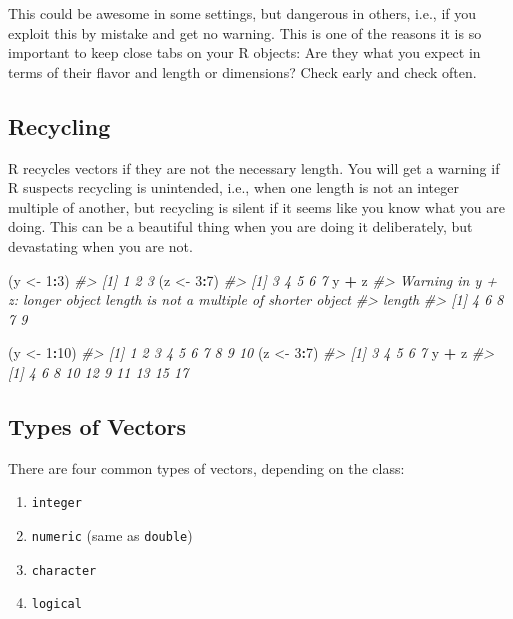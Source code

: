 \documentclass[
]{book}
\newenvironment{Shaded}{\begin{snugshade}}{\end{snugshade}}
\newcommand{\CommentTok}[1]{\textcolor[rgb]{0.56,0.35,0.01}{\textit{#1}}}
\newcommand{\DecValTok}[1]{\textcolor[rgb]{0.00,0.00,0.81}{#1}}
\newcommand{\NormalTok}[1]{#1}
\newcommand{\OperatorTok}[1]{\textcolor[rgb]{0.81,0.36,0.00}{\textbf{#1}}}
\newcommand{\StringTok}[1]{\textcolor[rgb]{0.31,0.60,0.02}{#1}}
\providecommand{\tightlist}{%
  \setlength{\itemsep}{0pt}\setlength{\parskip}{0pt}}
\begin{document}
This could be awesome in some settings, but dangerous in others, i.e., if you exploit this by mistake and get no warning. This is one of the reasons it is so important to keep close tabs on your R objects: Are they what you expect in terms of their flavor and length or dimensions? Check early and check often.

\hypertarget{recycling}{%
\subsection{Recycling}\label{recycling}}

R recycles vectors if they are not the necessary length. You will get a warning if R suspects recycling is unintended, i.e., when one length is not an integer multiple of another, but recycling is silent if it seems like you know what you are doing. This can be a beautiful thing when you are doing it deliberately, but devastating when you are not.

\begin{Shaded}
\begin{Highlighting}[]
\NormalTok{(y <-}\StringTok{ }\DecValTok{1}\OperatorTok{:}\DecValTok{3}\NormalTok{)}
\CommentTok{#> [1] 1 2 3}
\NormalTok{(z <-}\StringTok{ }\DecValTok{3}\OperatorTok{:}\DecValTok{7}\NormalTok{)}
\CommentTok{#> [1] 3 4 5 6 7}
\NormalTok{y }\OperatorTok{+}\StringTok{ }\NormalTok{z}
\CommentTok{#> Warning in y + z: longer object length is not a multiple of shorter object}
\CommentTok{#> length}
\CommentTok{#> [1] 4 6 8 7 9}

\NormalTok{(y <-}\StringTok{ }\DecValTok{1}\OperatorTok{:}\DecValTok{10}\NormalTok{)}
\CommentTok{#>  [1]  1  2  3  4  5  6  7  8  9 10}
\NormalTok{(z <-}\StringTok{ }\DecValTok{3}\OperatorTok{:}\DecValTok{7}\NormalTok{)}
\CommentTok{#> [1] 3 4 5 6 7}
\NormalTok{y }\OperatorTok{+}\StringTok{ }\NormalTok{z}
\CommentTok{#>  [1]  4  6  8 10 12  9 11 13 15 17}
\end{Highlighting}
\end{Shaded}

\hypertarget{types-of-vectors}{%
\subsection{Types of Vectors}\label{types-of-vectors}}

There are four common types of vectors, depending on the class:

\begin{enumerate}
\def\labelenumi{\arabic{enumi}.}
\tightlist
\item
  \texttt{integer}
\item
  \texttt{numeric} (same as \texttt{double})
\item
  \texttt{character}
\item
  \texttt{logical}
\end{enumerate}
\end{document}
